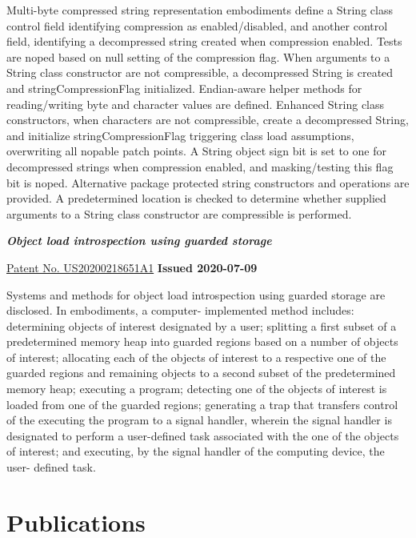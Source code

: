 \documentclass[margin,line]{res}
\begin{document}
\begin{resume}
\begin{list}{}{\leftmargin=0cm}
Multi-byte compressed string representation embodiments define a String class control field identifying compression as
enabled/disabled, and another control field, identifying a decompressed string created when compression enabled. Tests
are noped based on null setting of the compression flag. When arguments to a String class constructor are not
compressible, a decompressed String is created and stringCompressionFlag initialized. Endian-aware helper methods for
reading/writing byte and character values are defined. Enhanced String class constructors, when characters are not
compressible, create a decompressed String, and initialize stringCompressionFlag triggering class load assumptions,
overwriting all nopable patch points. A String object sign bit is set to one for decompressed strings when compression
enabled, and masking/testing this flag bit is noped. Alternative package protected string constructors and operations
are provided. A predetermined location is checked to determine whether supplied arguments to a String class constructor
are compressible is performed.

\item {\em \bf Object load introspection using guarded storage} 

\href{https://patents.google.com/patent/US20200218651A1}{Patent No. US20200218651A1} \hfill {\bf Issued 2020-07-09}

Systems and methods for object load introspection using guarded storage are disclosed. In embodiments, a computer-
implemented method includes: determining objects of interest designated by a user; splitting a first subset of a predetermined 
memory heap into guarded regions based on a number of objects of interest; allocating each of the objects of interest to a 
respective one of the guarded regions and remaining objects to a second subset of the predetermined memory heap; executing 
a program; detecting one of the objects of interest is loaded from one of the guarded regions; generating a trap that transfers 
control of the executing the program to a signal handler, wherein the signal handler is designated to perform a user-defined 
task associated with the one of the objects of interest; and executing, by the signal handler of the computing device, the user-
defined task.

\end{list}

\section{\sc Publications}


\end{resume}
\end{document}
